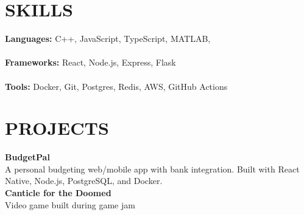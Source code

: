 \documentclass[11pt]{article}
\begin{document}
\hfill
\begin{minipage}[t]{0.32\textwidth}
    \section*{SKILLS}

    \textbf{Languages:} C++, JavaScript, TypeScript, MATLAB,  \\\\
    \textbf{Frameworks:} React, Node.js, Express, Flask \\\\
    \textbf{Tools:} Docker, Git, Postgres, Redis, AWS, GitHub Actions\\

    \section*{PROJECTS}

    \textbf{BudgetPal} \\
    A personal budgeting web/mobile app with bank integration. Built with React Native, Node.js, PostgreSQL, and Docker.\\

    \textbf{Canticle for the Doomed} \\
    Video game built during game jam
\end{minipage}
\end{document}
